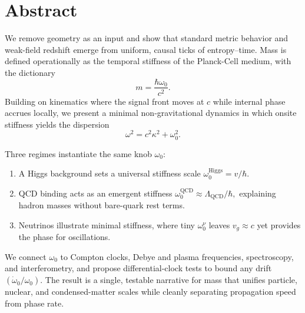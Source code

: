 \section*{Abstract}
We remove geometry as an input and show that standard metric behavior and weak-field redshift emerge from uniform, causal ticks of entropy--time. 
Mass is defined operationally as the temporal stiffness of the Planck-Cell medium, with the dictionary 
\[
  m = \frac{\hbar \omega_0}{c^2}.
\]
Building on kinematics where the signal front moves at \(c\) while internal phase accrues locally, we present a minimal non-gravitational dynamics in which onsite stiffness yields the dispersion
\[
  \omega^2 = c^2 \kappa^2 + \omega_0^2.
\]

Three regimes instantiate the same knob \(\omega_0\):
\begin{enumerate}[label=(\roman*)]
  \item A Higgs background sets a universal stiffness scale 
  \(\omega_0^{\mathrm{Higgs}} = v / \hbar.\)
  \item QCD binding acts as an emergent stiffness 
  \(\omega_0^{\mathrm{QCD}} \approx \Lambda_{\mathrm{QCD}} / \hbar,\)
  explaining hadron masses without bare-quark rest terms.
  \item Neutrinos illustrate minimal stiffness, where tiny 
  \(\omega_0^\nu\) leaves \(v_g \approx c\) yet provides the phase for oscillations.
\end{enumerate}

We connect \(\omega_0\) to Compton clocks, Debye and plasma frequencies, spectroscopy, and interferometry, and propose differential-clock tests to bound any drift \((\dot{\omega}_0 / \omega_0)\). 
The result is a single, testable narrative for mass that unifies particle, nuclear, and condensed-matter scales while cleanly separating propagation speed from phase rate.
